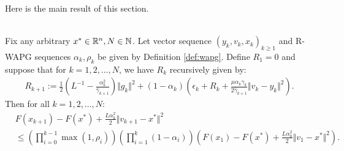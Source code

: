 \documentclass[12pt]{article}
\begin{document}
    Here is the main result of this section. 
    \begin{proposition}\label{prop:wapg-convergence}\; \\
        Fix any arbitrary $x^* \in \mathbb R^n, N \in \mathbb N$. 
        Let vector sequence $(y_k, v_{k}, x_{k})_{k \ge 1}$ and R-WAPG sequences $\alpha_k, \rho_k$ be given by Definition \ref{def:wapg}. 
        Define $R_1 = 0$ and suppose that for $k = 1, 2, \ldots, N$, we have $R_k$ recursively given by: 
        \begin{align*}
            R_{k + 1}
            := 
            \frac{1}{2}\left(
                L^{-1} - \frac{\alpha_k^2}{\hat \gamma_{k + 1}}
            \right)\Vert g_k\Vert^2
            + 
            (1 - \alpha_k)
            \left(
                \epsilon_k + R_k + 
                \frac{\mu\alpha_k\gamma_k}{2\hat \gamma_{k + 1}}
                \Vert v_k - y_k\Vert^2
            \right). 
        \end{align*}
        Then for all $k = 1, 2, \ldots, N$: 
        \begin{align*}
            & F(x_{k + 1}) - F(x^*) + \frac{L \alpha_k^2}{2}\Vert v_{k + 1} - x^*\Vert^2
            \\
            &\le 
            \left(
                \prod_{i = 0}^{k - 1} \max(1, \rho_{i})
            \right)
            \left(
                \prod_{i = 1}^{k} \left(1  - \alpha_i\right)
            \right)
            \left(
                F(x_1) - F(x^*) + \frac{L\alpha_0^2}{2}\Vert v_1 - x^*\Vert^2
            \right). 
        \end{align*}
    \end{proposition}
    
\end{document}
